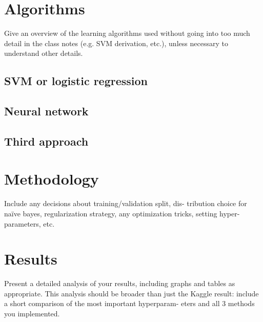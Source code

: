 \documentclass[conference]{IEEEtran}
\begin{document}
\section{Algorithms}

Give an overview of the learning algorithms used without going into too much detail in the class notes (e.g. SVM derivation, etc.), unless necessary to understand other details.

\subsection{SVM or logistic regression}

\subsection{Neural network}

\subsection{Third approach}


\section{Methodology}

Include any decisions about training/validation split, dis- tribution choice for naïve bayes, regularization strategy, any optimization tricks, setting hyper-parameters, etc.

\section{Results}

Present a detailed analysis of your results, including graphs and tables as appropriate. This analysis should be broader than just the Kaggle result: include a short comparison of the most important hyperparam- eters and all 3 methods you implemented.


\end{document}
